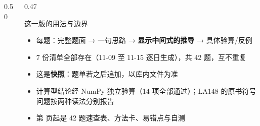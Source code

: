 \documentclass[aspectratio=169,10pt,fontset=none]{ctexbeamer}
\begin{document}
\begin{frame}[plain]
\begin{columns}[T,onlytextwidth]
\begin{column}{0.50\textwidth}
    \end{column}
    \begin{column}{0.47\textwidth}
      \begin{block}{这一版的用法与边界}
        \scriptsize
        \begin{itemize}\setlength{\itemsep}{1pt}
          \item 每题：完整题面 → 一句思路 → \textbf{显示中间式的推导} → 具体验算/反例
          \item 7 份清单全部存在（11-09 至 11-15 逐日生成），共 42 题，互不重复
          \item 这是\textbf{快照}：题单若之后追加，以库内文件为准
          \item 计算型结论经 NumPy 独立验算（14 项全部通过）；LA148 的原书符号问题按两种读法分别报告
          \item 第 \pageref{sec:answers} 页起是 42 题速查表、方法卡、易错点与自测
        \end{itemize}
      \end{block}
    \end{column}
  \end{columns}
\end{frame}
\end{document}
